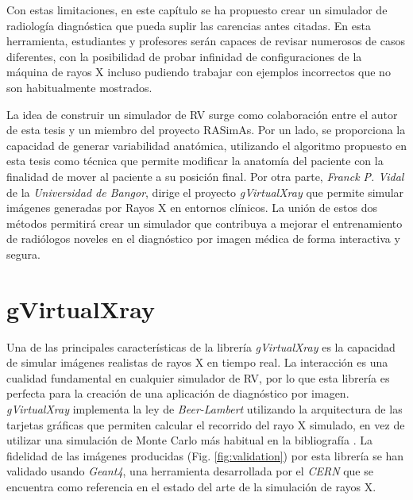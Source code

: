 Con estas limitaciones, en este capítulo se ha propuesto crear un simulador de radiología diagnóstica que pueda suplir las carencias antes citadas. En esta herramienta, estudiantes y profesores serán capaces de revisar numerosos de casos diferentes, con la posibilidad de probar infinidad de configuraciones de la máquina de rayos X incluso pudiendo trabajar con ejemplos incorrectos que no son habitualmente mostrados.


La idea de construir un simulador de \ac{RV} surge como colaboración entre el autor de esta tesis y un miembro del proyecto \ac{RASimAs}. Por un lado, se proporciona la capacidad de generar variabilidad anatómica, utilizando el algoritmo propuesto en esta tesis como técnica que permite modificar la anatomía del paciente con la finalidad de mover al paciente a su posición final.
Por otra parte, \emph{Franck P. Vidal} de la \emph{Universidad de Bangor}, dirige el proyecto \emph{gVirtualXray}\cite{vidal2009simulation} que permite simular imágenes generadas por Rayos X en entornos clínicos. La unión de estos dos métodos permitirá crear un simulador que contribuya a mejorar el entrenamiento de radiólogos noveles en el diagnóstico por imagen médica de forma interactiva y segura.


\section{gVirtualXray}
\label{xray:context}
Una de las principales características de la librería \emph{gVirtualXray} es la capacidad de simular imágenes realistas de rayos X en tiempo real. La interacción es una cualidad fundamental en cualquier simulador de \ac{RV}, por lo que esta librería es perfecta para la creación de una aplicación de diagnóstico por imagen. 
\emph{gVirtualXray} implementa la ley de \emph{Beer-Lambert} utilizando la arquitectura de las tarjetas gráficas que permiten calcular el recorrido del rayo X simulado, en vez de utilizar una simulación de Monte Carlo más habitual en la bibliografía \cite{vidal2009simulation}. La fidelidad de las imágenes producidas (Fig. \ref{fig:validation}) por esta librería se han validado usando \emph{Geant4}, una herramienta desarrollada por el \emph{CERN} que se encuentra como referencia en el estado del arte de la simulación de rayos X.

